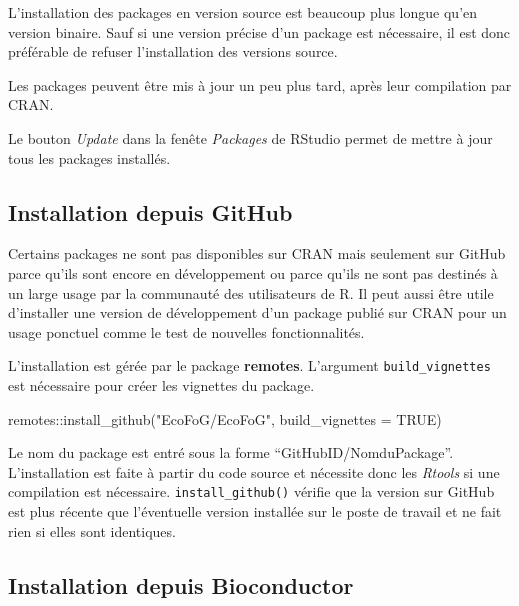 \documentclass[
  11pt,
  french,
  a4paper,
  extrafontsizes,onecolumn,openright
  ]{memoir}
\newenvironment{Shaded}{\begin{snugshade}}{\end{snugshade}}
\newcommand{\AttributeTok}[1]{\textcolor[rgb]{0.77,0.63,0.00}{#1}}
\newcommand{\ConstantTok}[1]{\textcolor[rgb]{0.00,0.00,0.00}{#1}}
\newcommand{\FunctionTok}[1]{\textcolor[rgb]{0.00,0.00,0.00}{#1}}
\newcommand{\NormalTok}[1]{#1}
\newcommand{\SpecialCharTok}[1]{\textcolor[rgb]{0.00,0.00,0.00}{#1}}
\newcommand{\StringTok}[1]{\textcolor[rgb]{0.31,0.60,0.02}{#1}}
\begin{document}
L'installation des packages en version source est beaucoup plus longue qu'en version binaire.
Sauf si une version précise d'un package est nécessaire, il est donc préférable de refuser l'installation des versions source.

Les packages peuvent être mis à jour un peu plus tard, après leur compilation par CRAN.

Le bouton \emph{Update} dans la fenête \emph{Packages} de RStudio permet de mettre à jour tous les packages installés.

\hypertarget{installation-depuis-github}{%
\subsection{Installation depuis GitHub}\label{installation-depuis-github}}

Certains packages ne sont pas disponibles sur CRAN mais seulement sur GitHub parce qu'ils sont encore en développement ou parce qu'ils ne sont pas destinés à un large usage par la communauté des utilisateurs de R.
Il peut aussi être utile d'installer une version de développement d'un package publié sur CRAN pour un usage ponctuel comme le test de nouvelles fonctionnalités.

L'installation est gérée par le package \textbf{remotes}.
L'argument \texttt{build\_vignettes} est nécessaire pour créer les vignettes du package.

\scriptsize

\begin{Shaded}
\begin{Highlighting}[]
\NormalTok{remotes}\SpecialCharTok{::}\FunctionTok{install\_github}\NormalTok{(}\StringTok{"EcoFoG/EcoFoG"}\NormalTok{, }\AttributeTok{build\_vignettes =} \ConstantTok{TRUE}\NormalTok{)}
\end{Highlighting}
\end{Shaded}

\normalsize

Le nom du package est entré sous la forme ``GitHubID/NomduPackage''.
L'installation est faite à partir du code source et nécessite donc les \emph{Rtools} si une compilation est nécessaire.
\texttt{install\_github()} vérifie que la version sur GitHub est plus récente que l'éventuelle version installée sur le poste de travail et ne fait rien si elles sont identiques.

\hypertarget{installation-depuis-bioconductor}{%
\subsection{Installation depuis Bioconductor}\label{installation-depuis-bioconductor}}
\end{document}
